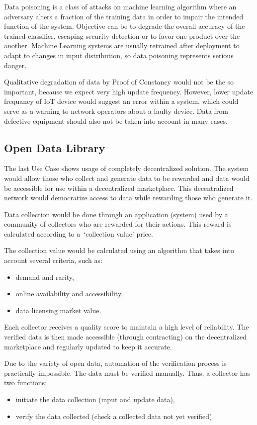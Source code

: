 Data poisoning is a class of attacks on machine learning algorithm where an adversary alters a fraction of the training data in order to impair the intended function of the system.
Objective can be to degrade the overall accuracy of the trained classifier, escaping security detection or to favor one product over the another.
Machine Learning systems are usually retrained after deployment to adapt to changes in input distribution, so data poisoning represents serious danger.

Qualitative degradation of data by Proof of Constancy would not be the so important, because we expect very high update frequency.
However, lower update frequancy of IoT device would suggest an error within a system, which could serve as a warning to network operators about a faulty device.
Data from defective equipment should also not be taken into account in many cases.

\subsection{Open Data Library}

The last Use Case shows usage of completely decentralized solution.
The system would allow those who collect and generate data to be rewarded and data would be accessible for use within a decentralized marketplace.
This decentralized network would democratize access to data while rewarding those who generate it.

Data collection would be done through an application (system) used by a community of collectors who are rewarded for their actions.
This reward is calculated according to a~\enquote*{collection value} price.

The collection value would be calculated using an algorithm that takes into account several criteria, such as:
\begin{itemize}
    \item demand and rarity,
    \item online availability and accessibility,
    \item data licensing market value.
\end{itemize}

Each collector receives a quality score to maintain a high level of reliability.
The verified data is then made accessible (through contracting) on the decentralized marketplace and regularly updated to keep it accurate.

Due to the variety of open data, automation of the verification process is practically impossible.
The data must be verified manually.
Thus, a collector has two functions:
\begin{itemize}
    \item initiate the data collection (input and update data),
    \item verify the data collected (check a collected data not yet verified).
\end{itemize}

